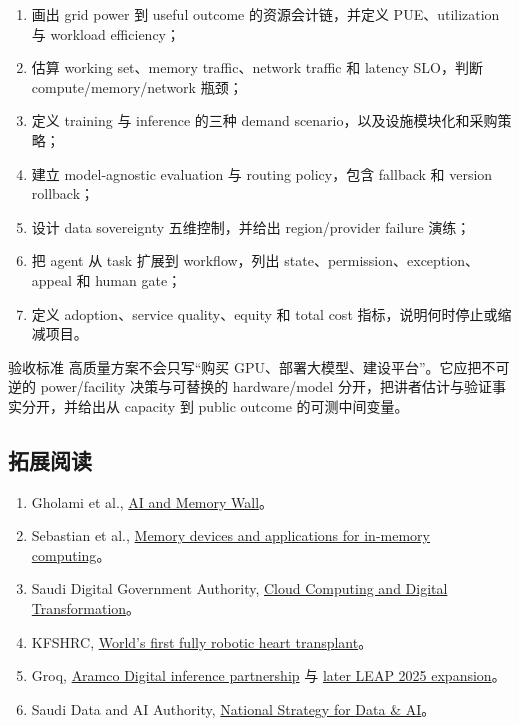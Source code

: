 \begin{enumerate}
  \item 画出 grid power 到 useful outcome 的资源会计链，并定义 PUE、utilization 与 workload efficiency；
  \item 估算 working set、memory traffic、network traffic 和 latency SLO，判断 compute/memory/network 瓶颈；
  \item 定义 training 与 inference 的三种 demand scenario，以及设施模块化和采购策略；
  \item 建立 model-agnostic evaluation 与 routing policy，包含 fallback 和 version rollback；
  \item 设计 data sovereignty 五维控制，并给出 region/provider failure 演练；
  \item 把 agent 从 task 扩展到 workflow，列出 state、permission、exception、appeal 和 human gate；
  \item 定义 adoption、service quality、equity 和 total cost 指标，说明何时停止或缩减项目。
\end{enumerate}

\begin{knowledgebox}{验收标准}
高质量方案不会只写“购买 GPU、部署大模型、建设平台”。它应把不可逆的 power/facility 决策与可替换的 hardware/model 分开，把讲者估计与验证事实分开，并给出从 capacity 到 public outcome 的可测中间变量。
\end{knowledgebox}

\subsection{拓展阅读}

\begin{enumerate}
  \item Gholami et al., \href{https://arxiv.org/abs/2403.14123}{AI and Memory Wall}。
  \item Sebastian et al., \href{https://www.nature.com/articles/s41565-020-0655-z}{Memory devices and applications for in-memory computing}。
  \item Saudi Digital Government Authority, \href{https://dga.gov.sa/sites/default/files/2024-08/Cloud%20Computing%20and%20its%20Role%20in%20Accelerating%20Digital%20Transformation%20and%20its%20Sustainable%20Impact%20in%20the%20Government%20Sector%20-%20V1.0.pdf}{Cloud Computing and Digital Transformation}。
  \item KFSHRC, \href{https://www.kfshrc.edu.sa/en/news/2024/09/kfshrc-pioneers-worlds-first-fully-robotic-heart-transplant}{World's first fully robotic heart transplant}。
  \item Groq, \href{https://groq.com/news_press/groq-and-aramco-digital-announce-partnership-to-establish-worlds-largest-inferenc-data-center-in-saudi-arabia}{Aramco Digital inference partnership} 与 \href{https://groq.com/news_press/saudi-arabia-announces-1-5b-expansion-to-fuel-ai-powered-economy-with-groq}{later LEAP 2025 expansion}。
  \item Saudi Data and AI Authority, \href{https://sdaia.gov.sa/en/SDAIA/about/Pages/Strategy.aspx}{National Strategy for Data \& AI}。
\end{enumerate}


